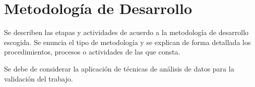 \chapter{Metodología de Desarrollo}

Se describen las etapas y actividades de acuerdo a la metodología de desarrollo escogida. Se enuncia el tipo de metodología y se explican de forma detallada los procedimientos, procesos o actividades de las que consta.\newline

Se debe de considerar la aplicación de técnicas de análisis de datos para la validación del trabajo.
